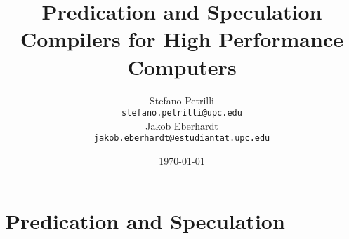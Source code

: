 \documentclass{article}
\title{Predication and Speculation \\[0.7em] \small{Compilers for High Performance Computers}}
\author{Stefano Petrilli\\ \texttt{stefano.petrilli@upc.edu}\\[1ex] %
  Jakob Eberhardt\\ \texttt{jakob.eberhardt@estudiantat.upc.edu}}
\date{\today}
\begin{document}
\maketitle
\thispagestyle{empty}
\newpage
\setcounter{page}{1}
\tableofcontents
\lstlistoflistings
\listoffigures
\listoftables
\newpage







\section{Predication and Speculation}
\label{sec:predication_and_speculation}
\newpage

\printbibliography
\end{document}
